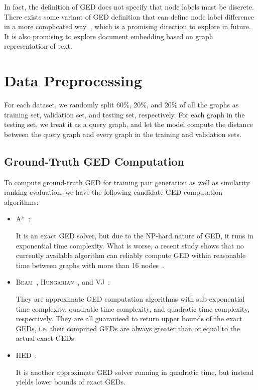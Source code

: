 \documentclass{article}
\newcommand{\hed}{\textsc{HED}\xspace}
\begin{document}
In fact, the definition of GED does not specify that node labels must be discrete. There exists some variant of GED definition that can define node label difference in a more complicated way~\cite{riesen2013novel}, which is a promising direction to explore in future. It is also promising to explore document embedding based on graph representation of text.
 \section{Data Preprocessing}
\label{sec-data-preproc}

For each dataset, we randomly split 60\%, 20\%, and 20\% of all the graphs as training set, validation set, and testing set, respectively. For each graph in the testing set, we treat it as a query graph, and let the model compute the distance between the query graph and every graph in the training and validation sets. 

\subsection{Ground-Truth GED Computation}
\label{subsec-ged-algo}

To compute ground-truth GED for training pair generation as well as similarity ranking evaluation, we have the following candidate GED computation algorithms:
\begin{itemize}
    \item \textsc{A*}~\cite{hart1968formal}:
    
    It is an exact GED solver, but due to the NP-hard nature of GED, it runs in exponential time complexity. What is worse, a recent study shows that no currently available algorithm can reliably compute GED within reasonable time between graphs with more than 16 nodes~\cite{blumenthal2018exact}.
    
    \item \textsc{Beam}~\cite{neuhaus2006fast}, \textsc{Hungarian}~\cite{riesen2009approximate}, and \textsc{VJ}~\cite{fankhauser2011speeding}:
    
    They are approximate GED computation algorithms with sub-exponential time complexity, quadratic time complexity, and quadratic time complexity, respectively. They are all guaranteed to return upper bounds of the exact GEDs, i.e. their computed GEDs are always greater than or equal to the actual exact GEDs.
    
    \item \hed~\cite{fischer2015approximation}:
    
    It is another approximate GED solver running in quadratic time, but instead yields lower bounds of exact GEDs.
\end{itemize}
\end{document}
